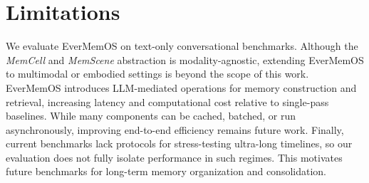 \section*{Limitations}
We evaluate EverMemOS on text-only conversational benchmarks. Although the \textit{MemCell} and \textit{MemScene} abstraction is modality-agnostic, extending EverMemOS to multimodal or embodied settings is beyond the scope of this work.
%
EverMemOS introduces LLM-mediated operations for memory construction and retrieval, increasing latency and computational cost relative to single-pass baselines. While many components can be cached, batched, or run asynchronously, improving end-to-end efficiency remains future work.
%
Finally, current benchmarks lack protocols for stress-testing ultra-long timelines, so our evaluation does not fully isolate performance in such regimes. This motivates future benchmarks for long-term memory organization and consolidation.